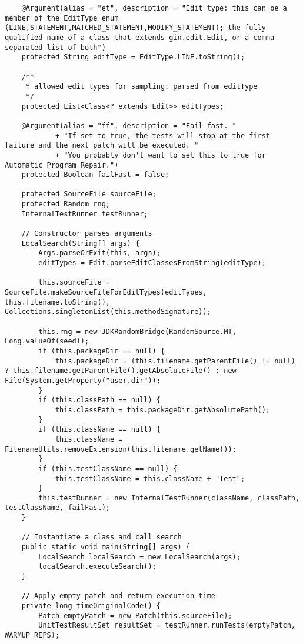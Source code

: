 \begin{lstlisting}
    @Argument(alias = "et", description = "Edit type: this can be a member of the EditType enum (LINE,STATEMENT,MATCHED_STATEMENT,MODIFY_STATEMENT); the fully qualified name of a class that extends gin.edit.Edit, or a comma-separated list of both")
    protected String editType = EditType.LINE.toString();

    /**
     * allowed edit types for sampling: parsed from editType
     */
    protected List<Class<? extends Edit>> editTypes;

    @Argument(alias = "ff", description = "Fail fast. "
            + "If set to true, the tests will stop at the first failure and the next patch will be executed. "
            + "You probably don't want to set this to true for Automatic Program Repair.")
    protected Boolean failFast = false;

    protected SourceFile sourceFile;
    protected Random rng;
    InternalTestRunner testRunner;

    // Constructor parses arguments
    LocalSearch(String[] args) {
        Args.parseOrExit(this, args);
        editTypes = Edit.parseEditClassesFromString(editType);

        this.sourceFile = SourceFile.makeSourceFileForEditTypes(editTypes, this.filename.toString(), Collections.singletonList(this.methodSignature));

        this.rng = new JDKRandomBridge(RandomSource.MT, Long.valueOf(seed));
        if (this.packageDir == null) {
            this.packageDir = (this.filename.getParentFile() != null) ? this.filename.getParentFile().getAbsoluteFile() : new File(System.getProperty("user.dir"));
        }
        if (this.classPath == null) {
            this.classPath = this.packageDir.getAbsolutePath();
        }
        if (this.className == null) {
            this.className = FilenameUtils.removeExtension(this.filename.getName());
        }
        if (this.testClassName == null) {
            this.testClassName = this.className + "Test";
        }
        this.testRunner = new InternalTestRunner(className, classPath, testClassName, failFast);
    }

    // Instantiate a class and call search
    public static void main(String[] args) {
        LocalSearch localSearch = new LocalSearch(args);
        localSearch.executeSearch();
    }

    // Apply empty patch and return execution time
    private long timeOriginalCode() {
        Patch emptyPatch = new Patch(this.sourceFile);
        UnitTestResultSet resultSet = testRunner.runTests(emptyPatch, WARMUP_REPS);


\end{lstlisting}
